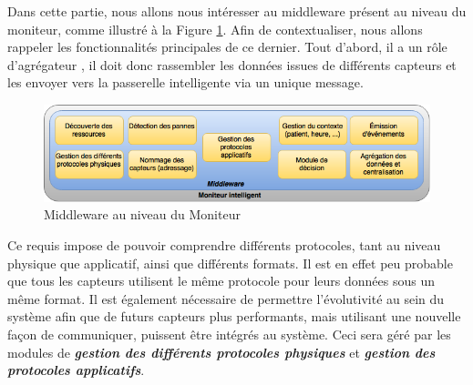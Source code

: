 Dans cette partie, nous allons nous intéresser au middleware présent au niveau du moniteur, comme illustré à la Figure \ref{4}. Afin de contextualiser, nous allons rappeler les fonctionnalités principales de ce dernier. Tout d'abord, il a un rôle d'agrégateur \cite{li2015iot}, il doit donc rassembler les données issues de différents capteurs et les envoyer vers la passerelle intelligente via un unique message. 
\newline
\begin{figure}[h!]
	\hspace*{-3cm}
	\centering
	\includegraphics[width=1.5\textwidth]{Figure4.png}
	\caption{Middleware au niveau du Moniteur}
	\label{4}
\end{figure}

Ce requis impose de pouvoir comprendre différents protocoles, tant au niveau physique que applicatif, ainsi que différents formats. Il est en effet peu probable que tous les capteurs utilisent le même protocole pour leurs données sous un même format. Il est également nécessaire de permettre l'évolutivité au sein du système afin que de futurs capteurs plus performants, mais utilisant une nouvelle façon de communiquer, puissent être intégrés au système. Ceci sera géré par les modules de \textbf{\textit{gestion des différents protocoles physiques}} et \textbf{\textit{gestion des protocoles applicatifs}}.
\newline

